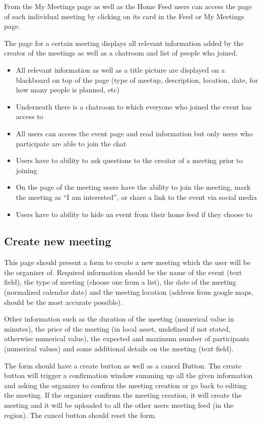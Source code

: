 \documentclass[conference]{IEEEtran}
\begin{document}
From the My Meetings page as well as the Home Feed users can access the page of each individual meeting by clicking on its card in the Feed or My Meetings page.

The page for a certain meeting displays all relevant information added by the creator of the meetings as well as a chatroom and list of people who joined.

\begin{itemize}
\item All relevant information as well as a title picture are displayed on a blackboard on top of the page (type of meetup, description, location, date, for how many people is planned, etc)
\item Underneath there is a chatroom to which everyone who joined the event has access to
\item All users can access the event page and read information but only users who participate are able to join the chat
\item Users have to ability to ask questions to the creator of a meeting prior to joining
\item On the page of the meeting users have the ability to join the meeting, mark the meeting as “I am interested”, or share a link to the event via social media
\item Users have to ability to hide an event from their home feed if they choose to
\end{itemize}

\subsection{Create new meeting}

This page should present a form to create a new meeting
which the user will be the organizer of. Required information should be the name of the event (text field), the type of meeting (choose one from a list), the date of the meeting (normalized calendar date) and the meeting location (address from google maps, should be the most accurate possible).

Other information such as the duration of the meeting (numerical value in minutes), the price of the meeting (in local asset, undefined if not stated, otherwise numerical value), the expected and maximum number of participants (numerical values) and some additional details on the meeting (text field).

The form should have a create button as well as a cancel Button. The create button will trigger a confirmation window summing up all the given information and asking the organizer to confirm the meeting creation or go back to editing the meeting. If the organizer confirms the meeting creation, it will create the meeting and it will be uploaded to all the other users meeting feed (in the region). The cancel button should reset the form.
\end{document}
